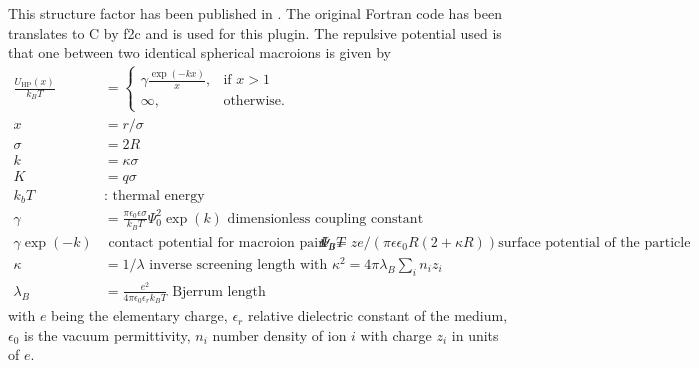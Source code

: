 This structure factor has been published in \cite{Hayter1981,Hansen1982}. The original Fortran code has been translates to C by f2c and is used for this plugin.
The repulsive potential used is that one between two identical spherical macroions is given by
\begin{align}\label{eq:HP_RMSA_potential}
  \frac{U_\mathrm{HP}(x)}{k_BT} &= 
  \begin{cases}
    \gamma\frac{\exp(-kx)}{x}, & \mbox{if } x > 1 \\
    \infty, & \mbox{otherwise}.
  \end{cases} \\
  x &= r/\sigma \\
  \sigma &= 2R \\
  k&=\kappa\sigma \\
  K&=q\sigma\\
  k_bT&: \mbox{ thermal energy}\\
  \gamma &=\frac{\pi\epsilon_0\epsilon\sigma}{k_BT}\Psi_0^2  \exp(k) \mbox{ dimensionless coupling constant} \\
  \gamma \exp(-k) & \mbox{  contact potential for macroion pair in unit of $k_B T$}
  \Psi_0 &= z e/(\pi\epsilon\epsilon_0 R(2+\kappa R)) \mbox{surface potential of the particle} \\
  \kappa&=1/\lambda \mbox{ inverse screening length with } \kappa^2=4\pi\lambda_B\sum_i n_iz_i\\
  \lambda_B&= \frac{e^2}{4\pi\epsilon_0\epsilon_r k_BT} \mbox{ Bjerrum length}
\end{align} 
with  $e$ being the elementary charge, $\epsilon_r$ relative dielectric constant of the medium, $\epsilon_0$ is the vacuum permittivity, $n_i$ number density of ion $i$ with charge $z_i$ in units of $e$. 